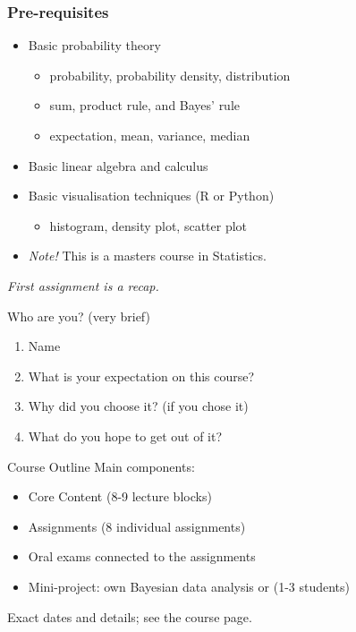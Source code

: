 \documentclass[10pt]{beamer}
\begin{document}
\begin{frame}
  \frametitle{Pre-requisites}
  \begin{itemize}
  \item Basic probability theory
    \begin{itemize}
    \item probability, probability density, distribution
    \item sum, product rule, and Bayes' rule
    \item expectation, mean, variance, median
  \end{itemize}
  \pause
  \item Basic linear algebra and calculus
  \pause
  \item Basic visualisation techniques (R or Python)
  \begin{itemize}
    \item histogram, density plot, scatter plot
  \end{itemize}
  \item \emph{Note!} This is a masters course in Statistics.
  \end{itemize}
  \pause
  \emph{First assignment is a recap.}
\end{frame}

\begin{frame}{Who are you? (very brief)}

\begin{enumerate}
\item Name
\item What is your expectation on this course?
\item Why did you choose it? (if you chose it)
\item What do you hope to get out of it?
\end{enumerate}

\end{frame}


\begin{frame}{Course Outline}
Main components:
\begin{itemize}
\item Core Content (8-9 lecture blocks)\pause
\item Assignments (8 individual assignments)\pause
\item Oral exams connected to the assignments\pause
\item Mini-project: own Bayesian data analysis or  (1-3 students)\pause
\end{itemize}
Exact dates and details; see the course page.
\end{frame}
\end{document}
